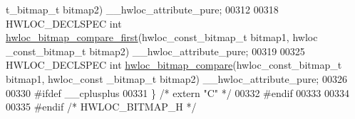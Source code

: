 \begin{DoxyCode}
      t\_bitmap\_t bitmap2) \_\_hwloc\_attribute\_pure;
00312 
00318 HWLOC\_DECLSPEC \textcolor{keywordtype}{int} \hyperlink{a00065_gac1cbd1e03f9986552243761e657e1752}{hwloc_bitmap_compare_first}(hwloc\_const\_bitmap\_t bitmap1, hwloc
      \_const\_bitmap\_t bitmap2) \_\_hwloc\_attribute\_pure;
00319 
00325 HWLOC\_DECLSPEC \textcolor{keywordtype}{int} \hyperlink{a00065_gadd3aa325f2d6a17b5aa3b3be9c740da0}{hwloc_bitmap_compare}(hwloc\_const\_bitmap\_t bitmap1, hwloc\_const
      \_bitmap\_t bitmap2) \_\_hwloc\_attribute\_pure;
00326 
00330 \textcolor{preprocessor}{#ifdef \_\_cplusplus}
00331 \textcolor{preprocessor}{}\} \textcolor{comment}{/* extern "C" */}
00332 \textcolor{preprocessor}{#endif}
00333 \textcolor{preprocessor}{}
00334 
00335 \textcolor{preprocessor}{#endif }\textcolor{comment}{/* HWLOC\_BITMAP\_H */}
\end{DoxyCode}
